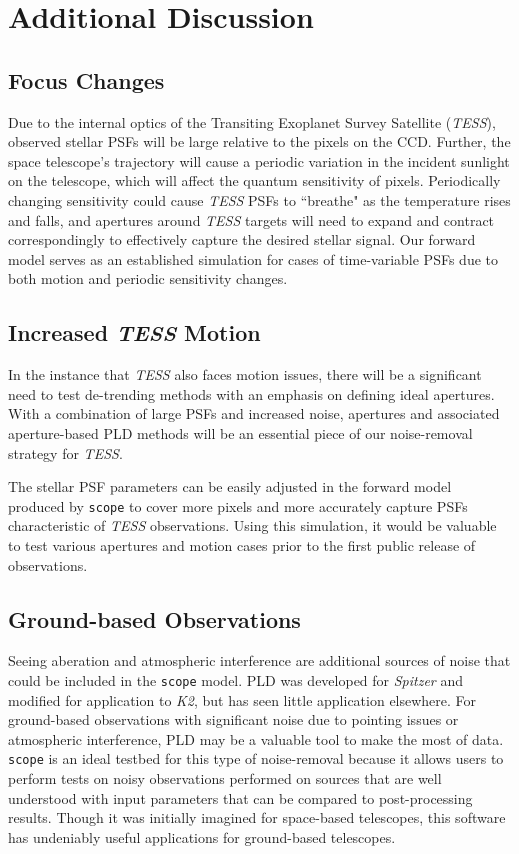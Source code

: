 \documentclass[12pt,preprint]{aastex}
\begin{document}
\section{Additional Discussion}

\subsection{Focus Changes}

Due to the internal optics of the Transiting Exoplanet Survey Satellite (\textit{TESS}), observed stellar PSFs will be large relative to the pixels on the CCD. Further, the space telescope's trajectory will cause a periodic variation in the incident sunlight on the telescope, which will affect the quantum sensitivity of pixels. Periodically changing sensitivity could cause \textit{TESS} PSFs to ``breathe" as the temperature rises and falls, and apertures around \textit{TESS} targets will need to expand and contract correspondingly to effectively capture the desired stellar signal. Our forward model serves as an established simulation for cases of time-variable PSFs due to both motion and periodic sensitivity changes.


\subsection{Increased \textit{TESS} Motion}

In the instance that \textit{TESS} also faces motion issues, there will be a significant need to test de-trending methods with an emphasis on defining ideal apertures. With a combination of large PSFs and increased noise, apertures and associated aperture-based PLD methods will be an essential piece of our noise-removal strategy for \textit{TESS}.

The stellar PSF parameters can be easily adjusted in the forward model produced by \texttt{scope} to cover more pixels and more accurately capture PSFs characteristic of \textit{TESS} observations. Using this simulation, it would be valuable to test various apertures and motion cases prior to the first public release of observations.

\subsection{Ground-based Observations}

Seeing aberation and atmospheric interference are additional sources of noise that could be included in the \texttt{scope} model. PLD was developed for \textit{Spitzer} and modified for application to \textit{K2}, but has seen little application elsewhere. For ground-based observations with significant noise due to pointing issues or atmospheric interference, PLD may be a valuable tool to make the most of data. \texttt{scope} is an ideal testbed for this type of noise-removal because it allows users to perform tests on noisy observations performed on sources that are well understood with input parameters that can be compared to post-processing results. Though it was initially imagined for space-based telescopes, this software has undeniably useful applications for ground-based telescopes.
\end{document}
